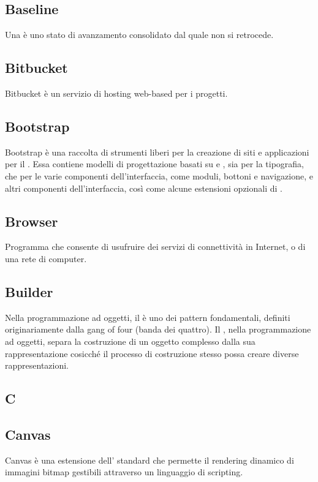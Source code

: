 \subsection{Baseline}
Una  è uno stato di avanzamento consolidato dal quale non si retrocede. 

\subsection{Bitbucket}
Bitbucket è un servizio di hosting web-based per i progetti.

\subsection{Bootstrap}
Bootstrap è una raccolta di strumenti liberi per la creazione di siti e applicazioni per il . Essa contiene modelli di progettazione basati su  e , sia per la tipografia, che per le varie componenti dell'interfaccia, come moduli, bottoni e navigazione, e altri componenti dell'interfaccia, così come alcune estensioni opzionali di .

\subsection{Browser}
Programma che consente di usufruire dei servizi di connettività in Internet, o di una rete di computer.

\subsection{Builder}
Nella programmazione ad oggetti, il  è uno dei pattern fondamentali, definiti originariamente dalla gang of four (banda dei quattro). Il  , nella programmazione ad oggetti, separa la costruzione di un oggetto complesso dalla sua rappresentazione cosicché il processo di costruzione stesso possa creare diverse rappresentazioni.

\newpage

\begin{center}
\Huge\section{\uppercase{C}}
\end{center}

\subsection{Canvas}
Canvas è una estensione dell' standard che permette il rendering dinamico di immagini bitmap gestibili attraverso un linguaggio di scripting.

